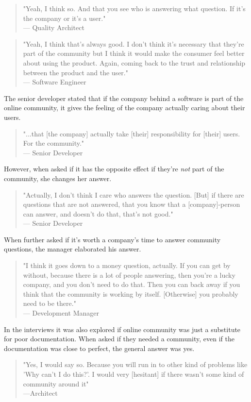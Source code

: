 \documentclass{cslthse-msc}
\begin{document}
    \begin{quote}
        "Yeah, I think so. And that you see who is answering what question. If it's the company or it's a user."\\--- Quality Architect
    \end{quote}
    \begin{quote}
        "Yeah, I think that's always good. I don't think it's necessary that they're part of the community but I think it would make the consumer feel better about using the product. Again, coming back to the trust and relationship between the product and the user."\\--- Software Engineer
    \end{quote}
    The senior developer stated that if the company behind a software is part of the online community, it gives the feeling of the company actually caring about their users.
    \begin{quote}
        "...that [the company] actually take [their] responsibility for [their] users. For the community." \\--- Senior Developer
    \end{quote}
    However, when asked if it has the opposite effect if they're \textit{not} part of the community, she changes her answer.
    \begin{quote}
        "Actually, I don't think I care who answers the question. [But] if there are questions that are not answered, that you know that a [company]-person can answer, and doesn't do that, that's not good."\\--- Senior Developer
    \end{quote}
    When further asked if it's worth a company's time to answer community questions, the manager elaborated his answer.
    \begin{quote}
        "I think it goes down to a money question, actually. If you can get by without, because there is a lot of people answering, then  you're a lucky company, and you don't need to do that. Then you can back away if you think that the community is working by itself. [Otherwise] you probably need to be there."\\--- Development Manager
    \end{quote}
    In the interviews it was also explored if online community was just a substitute for poor documentation. When asked if they needed a community, even if the documentation was close to perfect, the general answer was yes.
    \begin{quote}
        "Yes, I would say so. Because you will run in to other kind of problems like 'Why can't I do this?'. I would very [hesitant] if there wasn't some kind of community around it"\\---Architect
    \end{quote}
\end{document}
